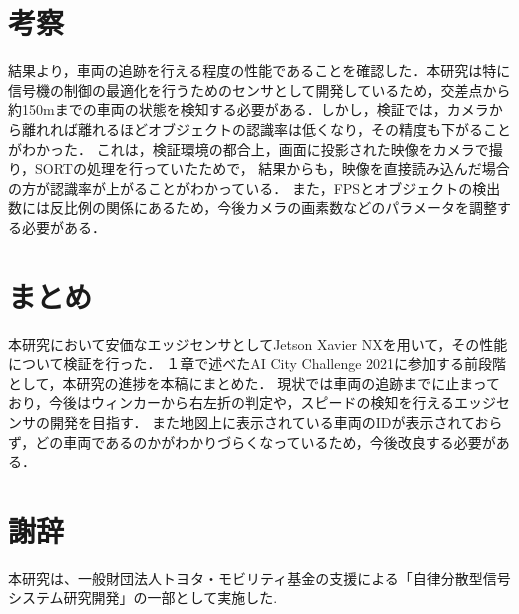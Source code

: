 \documentclass[technicalreport]{ieicej}
\begin{document}
\section{考察}
結果より，車両の追跡を行える程度の性能であることを確認した．本研究は特に信号機の制御の最適化を行うためのセンサとして開発しているため，交差点から
約150mまでの車両の状態を検知する必要がある．しかし，検証では，カメラから離れれば離れるほどオブジェクトの認識率は低くなり，その精度も下がることがわかった．
これは，検証環境の都合上，画面に投影された映像をカメラで撮り，SORTの処理を行っていたためで，
結果からも，映像を直接読み込んだ場合の方が認識率が上がることがわかっている．
また，FPSとオブジェクトの検出数には反比例の関係にあるため，今後カメラの画素数などのパラメータを調整する必要がある．

\section{まとめ}
本研究において安価なエッジセンサとしてJetson Xavier NXを用いて，その性能について検証を行った．
１章で述べたAI City Challenge 2021に参加する前段階として，本研究の進捗を本稿にまとめた．
現状では車両の追跡までに止まっており，今後はウィンカーから右左折の判定や，スピードの検知を行えるエッジセンサの開発を目指す．
また地図上に表示されている車両のIDが表示されておらず，どの車両であるのかがわかりづらくなっているため，今後改良する必要がある．

\section*{謝辞}
本研究は、一般財団法人トヨタ・モビリティ基金の支援による「自律分散型信号システム研究開発」の一部として実施した.

\end{document}
